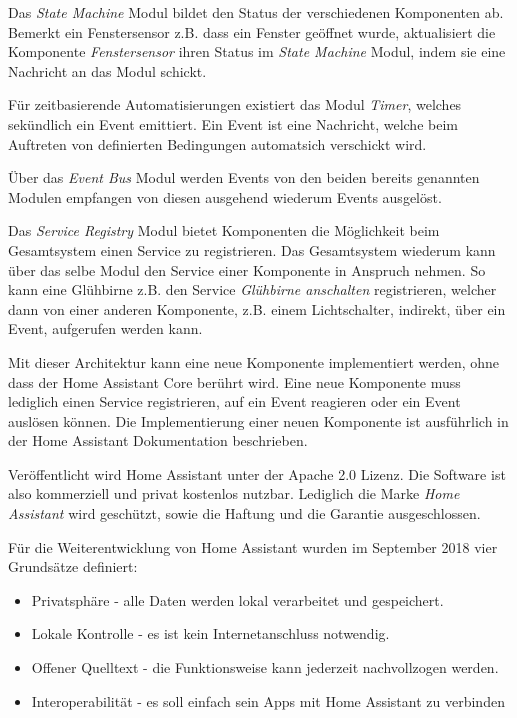 Das \textit{State Machine} Modul bildet den Status der verschiedenen Komponenten ab.
Bemerkt ein Fenstersensor z.B. dass ein Fenster geöffnet wurde, aktualisiert die Komponente \textit{Fenstersensor} ihren Status im \textit{State Machine} Modul, indem sie eine Nachricht an das Modul schickt.

Für zeitbasierende Automatisierungen existiert das Modul \textit{Timer}, welches sekündlich ein Event emittiert.
Ein Event ist eine Nachricht, welche beim Auftreten von definierten Bedingungen automatsich verschickt wird.

Über das \textit{Event Bus} Modul werden Events von den beiden bereits genannten Modulen empfangen von diesen ausgehend wiederum Events ausgelöst.

Das \textit{Service Registry} Modul bietet Komponenten die Möglichkeit beim Gesamtsystem einen Service zu registrieren.
Das Gesamtsystem wiederum kann über das selbe Modul den Service einer Komponente in Anspruch nehmen.
So kann eine Glühbirne z.B. den Service \textit{Glühbirne anschalten} registrieren, welcher dann von einer anderen Komponente, z.B. einem Lichtschalter, indirekt, über ein Event, aufgerufen werden kann.

Mit dieser Architektur kann eine neue Komponente implementiert werden, ohne dass der Home Assistant Core berührt wird.
Eine neue Komponente muss lediglich einen Service registrieren, auf ein Event reagieren oder ein Event auslösen können.
Die Implementierung einer neuen Komponente ist ausführlich in der Home Assistant Dokumentation beschrieben.

Veröffentlicht wird Home Assistant unter der Apache 2.0 Lizenz.
Die Software ist also kommerziell und privat kostenlos nutzbar.
Lediglich die Marke \textit{Home Assistant} wird geschützt, sowie die Haftung und die Garantie ausgeschlossen.

Für die Weiterentwicklung von Home Assistant wurden im September 2018 vier Grundsätze definiert:

\begin{itemize}
	\item Privatsphäre - alle Daten werden lokal verarbeitet und gespeichert.
	\item Lokale Kontrolle - es ist kein Internetanschluss notwendig.
	\item Offener Quelltext - die Funktionsweise kann jederzeit nachvollzogen werden.
	\item Interoperabilität - es soll einfach sein Apps mit Home Assistant zu verbinden
\end{itemize}


